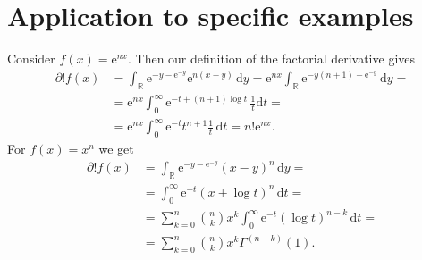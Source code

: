 \documentclass[english, parskip=full]{scrartcl}
\newcommand{\intx}{}
\newcommand{\intr}{}
\newcommand{\kla}{}
\newcommand{\e}{\text{e}}
\begin{document}
\section{Application to specific examples}
Consider $f(x) = \e^{nx}$.
Then our definition of the factorial derivative gives
\begin{align}
\partial ! f(x) &= \intr\int_{\mathbb{R}^{ }} \e^{-y-\e^{-y}} \e^{n(x-y)} \, \mathrm{d}y = \e^{nx} \intr\int_{\mathbb{R}^{ }} \e^{-y(n+1) - \e^{-y}} \, \mathrm{d}y = \\
&= \e^{nx} \intx\int_{0}^{\infty} \e^{-t + (n+1)\log t} \, \frac{1}{t}\mathrm{d}t = \\
&= \e^{nx} \intx\int_{0}^{\infty} \e^{-t} t^{n+1} \frac{1}{t} \, \mathrm{d}t = n! \e^{nx}.
\end{align}
For $f(x) = x^n$ we get
\begin{align}
\partial ! f(x) &= \intr\int_{\mathbb{R}^{ }} \e^{-y-\e^{-y}} (x-y)^n \, \mathrm{d}y = \\
&= \intx\int_{0}^{\infty} \e^{-t} \kla\left( x + \log t \right)^n \, \mathrm{d}t = \\
&= \sum_{k=0}^n \binom{n}{k} x^k \intx\int_{0}^{\infty} \e^{-t} (\log t)^{n-k} \, \mathrm{d}t = \\
&= \sum_{k=0}^n \binom{n}{k} x^k \Gamma^{(n-k)}(1).
\end{align}


\end{document}
